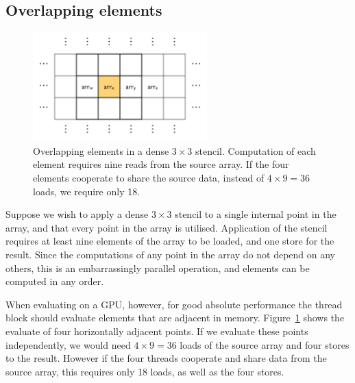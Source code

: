 \subsection{Overlapping elements}

\begin{figure}[htbp]
    \begin{center}
        \includegraphics[width=0.6\textwidth]{images/sec-6/stencil-sharing}
    \end{center}
    \caption[Overlapping elements in a $3\times3$ stencil]{Overlapping elements
        in a dense $3\times3$ stencil. Computation of each element requires nine
        reads from the source array. If the four elements cooperate to share the
        source data, instead of $4 \times 9 = 36$ loads, we require only 18.}
    \label{fig:stencil_sharing}
\end{figure}

Suppose we wish to apply a dense $3\times3$ stencil to a single internal point
in the array, and that every point in the array is utilised. Application of the
stencil requires at least nine elements of the array to be loaded, and one store
for the result. Since the computations of any point in the array do not depend
on any others, this is an embarrassingly parallel operation, and elements can be
computed in any order.

When evaluating on a GPU, however, for good absolute performance the thread
block should evaluate elements that are adjacent in memory.
Figure~\ref{fig:stencil_sharing} shows the evaluate of four horizontally
adjacent points. If we evaluate these points independently, we would need
$4 \times 9 = 36$ loads of the source array and four stores to the result.
However if the four threads cooperate and share data from the source array, this
requires only 18 loads, as well as the four stores.

